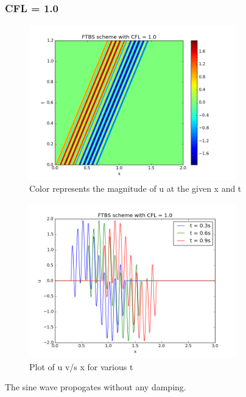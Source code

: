 \documentclass[11pt, a4paper]{article}
\begin{document}
\subsubsection{CFL = 1.0}
\begin{figure}[H]
 \centering
 \includegraphics[width = 0.8\textwidth]{FTBS3_1.png}
 \caption{Color represents the magnitude of u at the given x and t}
\end{figure}

\begin{figure}[H]
 \centering
 \includegraphics[width = 0.8\textwidth]{FTBS3_1_1.png}
 \caption{Plot of u v/s x for various t}
\end{figure}

The sine wave propogates without any damping.
\end{document}
